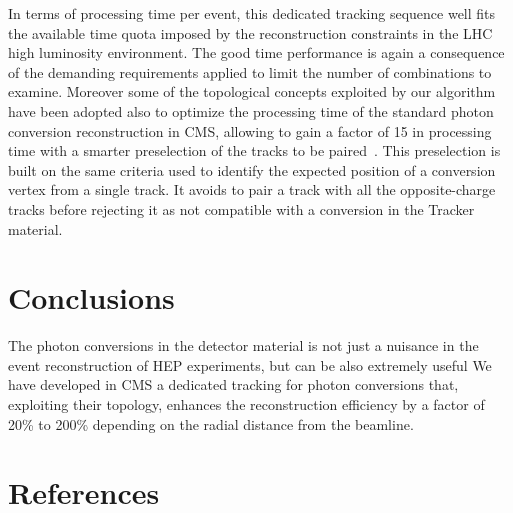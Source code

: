 \documentclass[a4paper]{jpconf}
\begin{document}
In terms of processing time per event, this dedicated tracking sequence well fits the available time quota imposed by the reconstruction constraints in the LHC high luminosity  environment.  The good time performance is again a consequence of the demanding requirements applied to limit the number of combinations to examine.
Moreover some of the topological concepts exploited by our algorithm have been adopted also to optimize the processing time of the standard photon conversion reconstruction  in CMS, allowing to gain a factor of 15 in processing time with a smarter preselection of the tracks to be paired~\cite{recoImprovement}. This preselection is built on the same criteria used to identify the expected position of a conversion vertex from a single track. It avoids to pair a track with all the opposite-charge tracks before rejecting it as not compatible with a conversion in the Tracker material.

\section{Conclusions}
\label{section_conclusions}

The photon conversions in the detector material is not just a nuisance in the event reconstruction of HEP experiments, but can be also extremely useful 
We have developed in CMS	a dedicated tracking for photon  conversions that,
exploiting their topology, enhances the reconstruction efficiency by a factor of 20\% to 200\% depending on the radial distance from the beamline.

\section*{References}
%



{}

%
%
\end{document}
